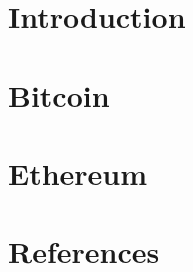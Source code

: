 \section[Intro]{Introduction}



\section[BTC]{Bitcoin}



\section[ETH]{Ethereum}




\section[Refs]{References}


